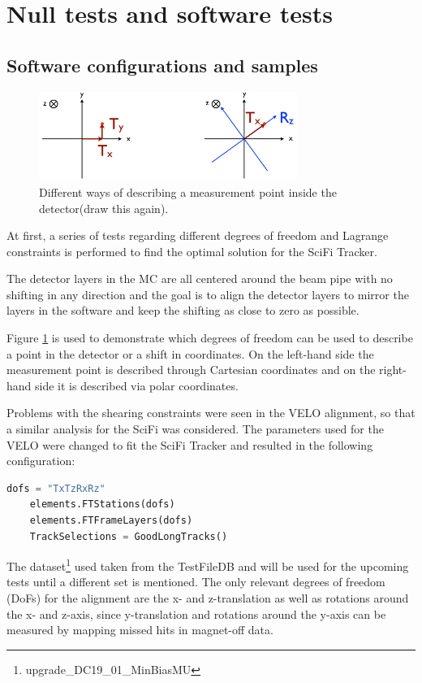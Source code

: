 \section{Null tests and software tests}
\subsection{Software configurations and samples}
\begin{figure}
  \centering
  \includegraphics[width=0.75\textwidth]{plots/point_dofs.png}
  \caption{Different ways of describing a measurement point inside the detector(draw this again).}
  \label{fig:dofs}
\end{figure}

At first, a series of tests regarding different degrees of freedom and Lagrange constraints is performed to find the optimal solution for the SciFi Tracker.

The detector layers in the MC are all centered around the beam pipe with no shifting in any direction and the goal is to align the detector layers to mirror the layers in the software and keep the shifting as close to zero as possible.

Figure \ref{fig:dofs} is used to demonstrate which degrees of freedom can be used
to describe a point in the detector or a shift in coordinates.
On the left-hand side the measurement point is described through Cartesian coordinates and on the right-hand side it is described via polar coordinates.

Problems with the shearing constraints were seen in the VELO alignment, so that a similar analysis for the SciFi was considered.
The parameters used for the VELO were changed to fit the SciFi Tracker and resulted in the following configuration:

\begin{lstlisting}[language=Python]
    dofs = "TxTzRxRz"
    elements.FTStations(dofs)
    elements.FTFrameLayers(dofs)
    TrackSelections = GoodLongTracks()
\end{lstlisting}

The dataset\footnote{upgrade\_DC19\_01\_MinBiasMU} used taken from the TestFileDB\cite{testDB} and will be used for the upcoming tests until a different set is mentioned.
The only relevant degrees of freedom (DoFs) for the alignment are the x- and z-translation as well as rotations around the x- and z-axis, since y-translation and rotations around the y-axis can be measured by mapping missed hits in magnet-off data.

